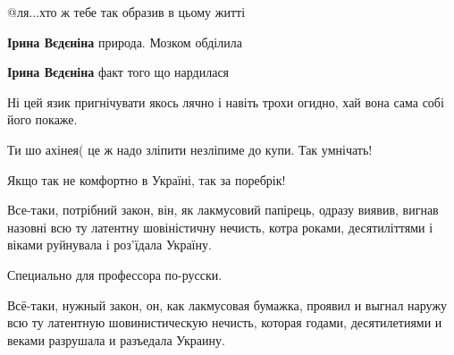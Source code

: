 \begin{itemize}
 
@ля...хто ж тебе так образив в цьому житті🤔🧐

\begin{itemize}
 
\textbf{Ірина Вєдєніна} природа. Мозком обділила

 
\textbf{Ірина Вєдєніна} факт того що нардилася
\end{itemize}

 
Ні цей язик пригнічувати якось лячно і навіть трохи огидно, хай вона сама собі його покаже.

 
Ти шо ахінея( це ж надо зліпити незліпиме до купи. Так умнічать!

Якщо так не комфортно в Україні, так за поребрік!

 

Все-таки, потрібний закон, він, як лакмусовий папірець, одразу виявив, вигнав
назовні всю ту латентну шовіністичну нечисть, котра роками, десятиліттями і
віками руйнувала і роз'їдала Україну.

Специально для профессора по-русски.

Всё-таки, нужный закон, он, как лакмусовая бумажка, проявил и выгнал наружу всю
ту латентную шовинистическую нечисть, которая годами, десятилетиями и веками
разрушала и разъедала Украину.

\begin{itemize}
 

\end{itemize}
\end{itemize}
